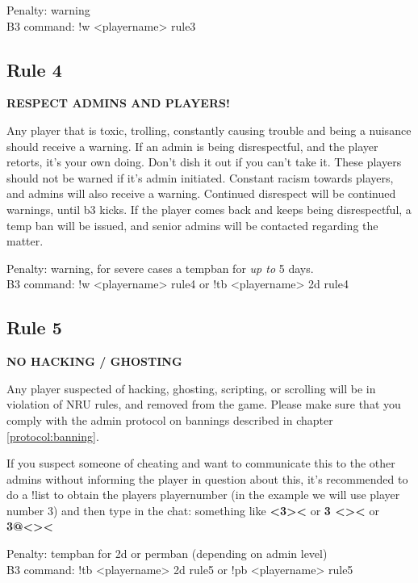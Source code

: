 \begin{addmargin}[2em]{4em}
Penalty: warning \\
B3 command: !w <playername> rule3
\end{addmargin}

\subsection*{Rule 4}
\label{rules:sd:4}
\textbf{RESPECT ADMINS AND PLAYERS!}

Any player that is toxic, trolling, constantly causing trouble and being a nuisance should receive a warning. If an admin is being disrespectful, and the player retorts, it's your own doing. Don't dish it out if you can't take it. These players should not be warned if it's admin initiated. Constant racism towards players, and admins will also receive a warning. Continued disrespect will be continued warnings, until b3 kicks. If the player comes back and keeps being disrespectful, a temp ban will be issued, and senior admins will be contacted regarding the matter.

\begin{addmargin}[2em]{4em}
Penalty: warning, for severe cases a tempban for \textit{up to} 5 days.\\
B3 command: !w <playername> rule4 or !tb <playername> 2d rule4
\end{addmargin}

\subsection*{Rule 5}
\label{rules:sd:5}
\textbf{NO HACKING / GHOSTING}

Any player suspected of hacking, ghosting, scripting, or scrolling will be in violation of NRU rules, and removed from the game. Please make sure that you comply with the admin protocol on bannings described in chapter \ref{protocol:banning}.

If you suspect someone of cheating and want to communicate this to the other admins without informing the player in question about this, it's recommended to do a !list to obtain the players playernumber (in the example we will use player number 3) and then type in the chat: something like \textbf{<3><} or \textbf{3 <><}  or \textbf{3@<><}

\begin{addmargin}[2em]{4em}
Penalty: tempban for 2d or permban (depending on admin level)\\
B3 command: !tb <playername> 2d rule5 or !pb <playername> rule5
\end{addmargin}

